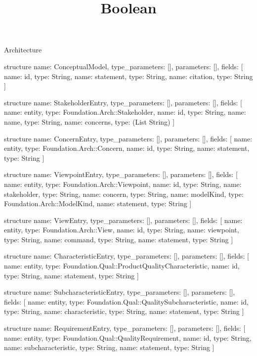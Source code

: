 \begin{lexlean}{Architecture}
\title{Boolean}
\begin{semanticmodule}
structure{
  name: ConceptualModel,
  type_parameters: [],
  parameters: [],
  fields: [
    {name: id, type: String},
    {name: statement, type: String},
    {name: citation, type: String}
  ]
}

structure{
  name: StakeholderEntry,
  type_parameters: [],
  parameters: [],
  fields: [
    {name: entity, type: Foundation.Arch::Stakeholder},
    {name: id, type: String},
    {name: name, type: String},
    {name: concerns, type: (List String)}
  ]
}

structure{
  name: ConcernEntry,
  type_parameters: [],
  parameters: [],
  fields: [
    {name: entity, type: Foundation.Arch::Concern},
    {name: id, type: String},
    {name: statement, type: String}
  ]
}

structure{
  name: ViewpointEntry,
  type_parameters: [],
  parameters: [],
  fields: [
    {name: entity, type: Foundation.Arch::Viewpoint},
    {name: id, type: String},
    {name: stakeholder, type: String},
    {name: concern, type: String},
    {name: modelKind, type: Foundation.Arch::ModelKind},
    {name: statement, type: String}
  ]
}

structure{
  name: ViewEntry,
  type_parameters: [],
  parameters: [],
  fields: [
    {name: entity, type: Foundation.Arch::View},
    {name: id, type: String},
    {name: viewpoint, type: String},
    {name: command, type: String},
    {name: statement, type: String}
  ]
}

structure{
  name: CharacteristicEntry,
  type_parameters: [],
  parameters: [],
  fields: [
    {name: entity, type: Foundation.Qual::ProductQualityCharacteristic},
    {name: id, type: String},
    {name: statement, type: String}
  ]
}

structure{
  name: SubcharacteristicEntry,
  type_parameters: [],
  parameters: [],
  fields: [
    {name: entity, type: Foundation.Qual::QualitySubcharacteristic},
    {name: id, type: String},
    {name: characteristic, type: String},
    {name: statement, type: String}
  ]
}

structure{
  name: RequirementEntry,
  type_parameters: [],
  parameters: [],
  fields: [
    {name: entity, type: Foundation.Qual::QualityRequirement},
    {name: id, type: String},
    {name: subcharacteristic, type: String},
    {name: statement, type: String}
  ]
}


\end{semanticmodule}
\end{lexlean}

